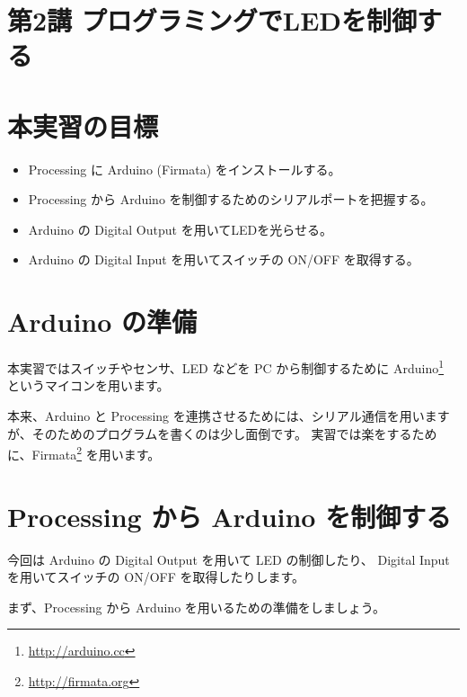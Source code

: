 \documentclass[11pt,a4paper]{jarticle}
\begin{document}
\section*{\LARGE{第2講 プログラミングでLEDを制御する}}
\section{本実習の目標}
\begin{itemize}
\item Processing に Arduino (Firmata) をインストールする。
\item Processing から Arduino を制御するためのシリアルポートを把握する。
\item Arduino の Digital Output を用いてLEDを光らせる。
\item Arduino の Digital Input を用いてスイッチの ON/OFF を取得する。
\end{itemize}



\section{Arduino の準備}
本実習ではスイッチやセンサ、LED などを PC から制御するために Arduino\footnote{\url{http://arduino.cc}} というマイコンを用います。

本来、Arduino と Processing を連携させるためには、シリアル通信を用いますが、そのためのプログラムを書くのは少し面倒です。
実習では楽をするために、Firmata\footnote{\url{http://firmata.org}} を用います。


\section{Processing から Arduino を制御する}
今回は Arduino の Digital Output を用いて LED の制御したり、
Digital Input を用いてスイッチの ON/OFF を取得したりします。

まず、Processing から Arduino を用いるための準備をしましょう。
\end{document}
